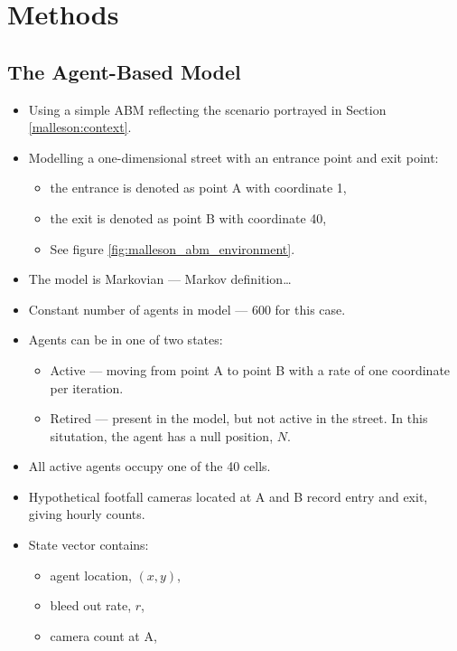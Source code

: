 \section{Methods}
\label{malleson:methods}

\subsection{The Agent-Based Model}
\label{malleson:methods:abm}

\begin{itemize}
    \item Using a simple ABM reflecting the scenario portrayed in Section \ref{malleson:context}.
    \item Modelling a one-dimensional street with an entrance point and exit point:
    \begin{itemize}
        \item the entrance is denoted as point A with coordinate 1,
        \item the exit is denoted as point B with coordinate 40,
        \item See figure \ref{fig:malleson_abm_environment}.
    \end{itemize}
    \item The model is Markovian --- Markov definition\ldots
    \item Constant number of agents in model --- 600 for this case.
    \item Agents can be in one of two states:
    \begin{itemize}
        \item Active --- moving from point A to point B with a rate of one coordinate per iteration.
        \item Retired --- present in the model, but not active in the street. In this situtation, the agent has a null position, $N$.
    \end{itemize}
    \item All active agents occupy one of the 40 cells.
    \item Hypothetical footfall cameras located at A and B record entry and exit, giving hourly counts.
    \item State vector contains:
    \begin{itemize}
        \item agent location, $\left( x , y \right)$,
        \item bleed out rate, $r$,
        \item camera count at A,

\end{itemize}
\end{itemize}
